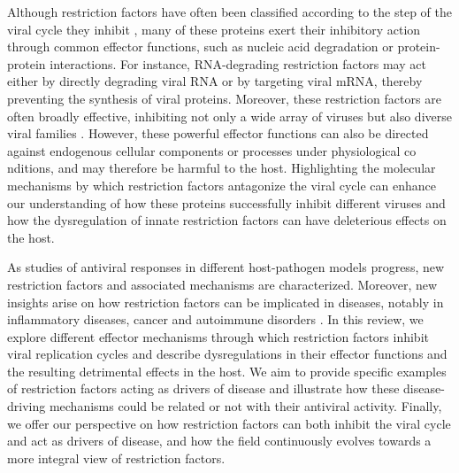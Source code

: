 \documentclass{enslyonreview}
\begin{document}
Although restriction factors have often been classified according to the step of the viral
cycle they inhibit \cite{klugeSnapShotAntiviralRestriction2015,serreroRestrictionFactorsRegulating2024}, many of these proteins exert their inhibitory
action through common effector functions, such as nucleic acid degradation or
protein-protein interactions. For instance, RNA-degrading restriction factors may act either
by directly degrading viral RNA or by targeting viral mRNA, thereby preventing the synthesis
of viral proteins. Moreover, these restriction factors are often broadly effective, inhibiting
not only a wide array of viruses but also diverse viral families \cite{klugeSnapShotAntiviralRestriction2015}. However,
these powerful effector functions can also be directed against endogenous cellular components
or processes under physiological co
nditions, and may therefore be harmful to the host.
Highlighting the molecular mechanisms by which restriction factors antagonize the viral cycle
can enhance our understanding of how these proteins successfully inhibit different viruses and
how the dysregulation of innate restriction factors can have deleterious effects on the host.

As studies of antiviral responses in different host-pathogen models progress, new restriction
factors and associated mechanisms are characterized. Moreover, new insights arise on how
restriction factors can be implicated in diseases, notably in inflammatory diseases, cancer
and autoimmune disorders \cite{luIFI16PromotesProgression2024,russellSAMD9LAutoinflammatoryAtaxia2021,morelPKRDoubleStranded2009}. In this review, we explore
different effector mechanisms through which restriction factors inhibit viral replication
cycles and describe dysregulations in their effector functions and the resulting detrimental
effects in the host. We aim to provide specific examples of restriction factors acting as
drivers of disease and illustrate how these disease-driving mechanisms could be related or not
with their antiviral activity. Finally, we offer our perspective on how restriction factors
can both inhibit the viral cycle and act as drivers of disease, and how the field continuously
evolves towards a more integral view of restriction factors.
\end{document}
